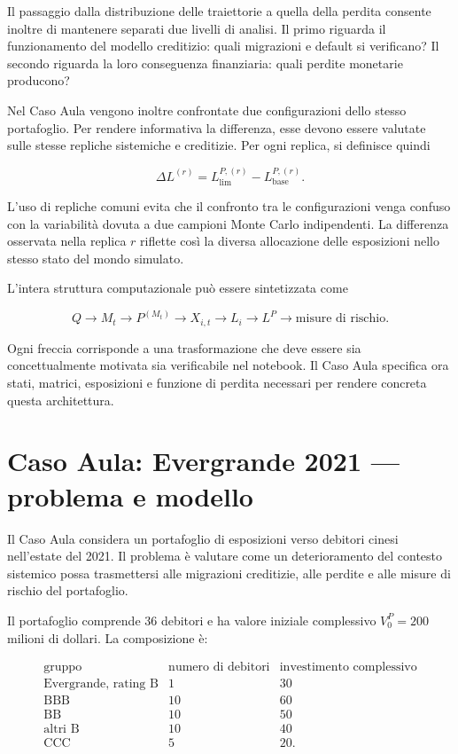 Il passaggio dalla distribuzione delle traiettorie a quella della perdita
consente inoltre di mantenere separati due livelli di analisi. Il primo
riguarda il funzionamento del modello creditizio: quali migrazioni e default
si verificano? Il secondo riguarda la loro conseguenza finanziaria: quali
perdite monetarie producono?

Nel Caso Aula vengono inoltre confrontate due configurazioni dello stesso
portafoglio. Per rendere informativa la differenza, esse devono essere
valutate sulle stesse repliche sistemiche e creditizie. Per ogni replica, si
definisce quindi

\[
\Delta L^{(r)}
=
L_{\mathrm{lim}}^{P,(r)}
-
L_{\mathrm{base}}^{P,(r)}.
\]

L'uso di repliche comuni evita che il confronto tra le configurazioni venga
confuso con la variabilit\`a dovuta a due campioni Monte Carlo indipendenti.
La differenza osservata nella replica $r$ riflette cos\`i la diversa
allocazione delle esposizioni nello stesso stato del mondo simulato.

L'intera struttura computazionale pu\`o essere sintetizzata come

\[
Q
\longrightarrow
M_t
\longrightarrow
P^{(M_t)}
\longrightarrow
X_{i,t}
\longrightarrow
L_i
\longrightarrow
L^P
\longrightarrow
\text{misure di rischio}.
\]

Ogni freccia corrisponde a una trasformazione che deve essere sia
concettualmente motivata sia verificabile nel notebook. Il Caso Aula
specifica ora stati, matrici, esposizioni e funzione di perdita necessari
per rendere concreta questa architettura.
%


\section{Caso Aula: Evergrande 2021 --- problema e modello}

Il Caso Aula considera un portafoglio di esposizioni verso debitori cinesi
nell'estate del 2021. Il problema \`e valutare come un deterioramento del
contesto sistemico possa trasmettersi alle migrazioni creditizie, alle
perdite e alle misure di rischio del portafoglio.

Il portafoglio comprende $36$ debitori e ha valore iniziale complessivo
$V_0^P=200$ milioni di dollari. La composizione \`e:

\[
\begin{array}{lcc}
\text{gruppo} & \text{numero di debitori} & \text{investimento complessivo}
\\ \hline
\text{Evergrande, rating B} & 1 & 30
\\
\text{BBB} & 10 & 60
\\
\text{BB} & 10 & 50
\\
\text{altri B} & 10 & 40
\\
\text{CCC} & 5 & 20.
\end{array}
\]

